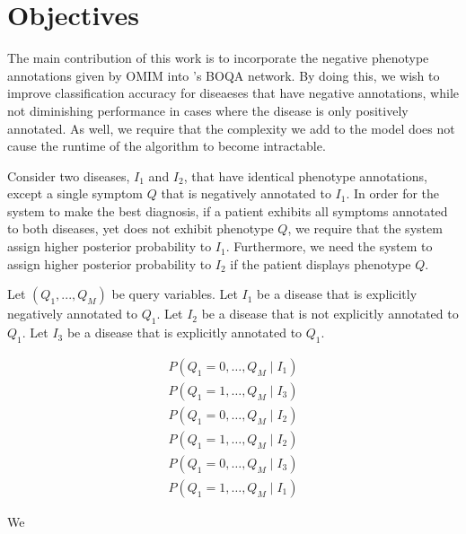\section{Objectives}
\label{sec:obj}

The main contribution of this work is to incorporate the negative phenotype
annotations given by OMIM \cite{hamosh2005online} into
\citeauthor{kohler2014hpo}'s BOQA network.
By doing this, we wish to improve classification accuracy for diseaeses that
have negative annotations, while not diminishing performance in cases where the
disease is only positively annotated.
As well, we require that the complexity we add to the model does not cause the
runtime of the algorithm to become intractable.

Consider two diseases, $I_1$ and $I_2$, that have identical phenotype
annotations, except a single symptom $Q$ that is negatively annotated to $I_1$.
In order for the system to make the best diagnosis, if a patient exhibits all
symptoms annotated to both diseases, yet does not exhibit phenotype $Q$, we
require that the system assign higher posterior probability to $I_1$.
Furthermore, we need the system to assign higher posterior probability to $I_2$
if the patient displays phenotype $Q$.

Let $(Q_1, ..., Q_M)$ be query variables.
Let $I_1$ be a disease that is explicitly negatively annotated to $Q_1$.
Let $I_2$ be a disease that is not explicitly annotated to $Q_1$.
Let $I_3$ be a disease that is explicitly annotated to $Q_1$.

\begin{align*}
    P(Q_1 = 0, \hdots, Q_M \mid I_1) \\
    P(Q_1 = 1, \hdots, Q_M \mid I_3) \\
    P(Q_1 = 0, \hdots, Q_M \mid I_2) \\
    P(Q_1 = 1, \hdots, Q_M \mid I_2) \\
    P(Q_1 = 0, \hdots, Q_M \mid I_3) \\
    P(Q_1 = 1, \hdots, Q_M \mid I_1) 
\end{align*}
      

We 
